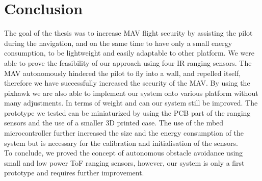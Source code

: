 \chapter{Conclusion}
The goal of the thesis was to increase MAV flight security by assisting the pilot during the navigation, and on the same time to have only a small energy consumption, to be lightweight and easily adaptable to other platform. We were able to prove the feasibility of our approach using four IR ranging sensors. The MAV autonomously hindered the pilot to fly into a wall, and repelled itself, therefore we have successfully increased the security of the MAV. By using the pixhawk we are also able to implement our system onto various platform without many adjustments. In terms of weight and can our system still be improved. The prototype we tested can be miniaturized by using the PCB part of the ranging sensors and the use of a smaller 3D printed case. The use of the mbed microcontroller further increased the size and the energy consumption of the system but is necessary for the calibration and initialisation of the sensors.\\
To conclude, we proved the concept of autonomous obstacle avoidance using small and low power ToF ranging sensors, however, our system is only a first prototype and requires further improvement.\\
